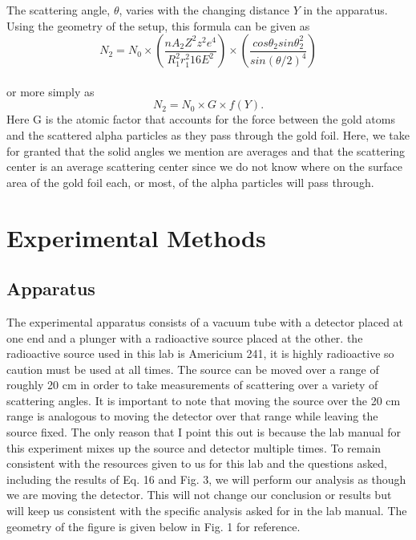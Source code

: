 The scattering angle, $\theta$, varies with the changing distance $Y$ in the apparatus. Using the geometry of the setup, this formula can be given as
\begin{equation} \label{complicated}N_2=N_0\times \left( \frac{nA_2Z^2z^2e^4}{R_1^2r_1^2 16 E^2}\right)\times \left(\frac{cos\theta_2 sin\theta_2^2}{sin(\theta/2)^4}\right) \end {equation}\\or more simply as\begin{equation}  \label{simple}N_2=N_0\times G\times f(Y). \end{equation} Here G is the atomic factor that accounts for the force between the gold atoms and the scattered alpha particles as they pass through the gold foil. Here, we take for granted that the solid angles we mention are averages and that the scattering center is an average scattering center since we do not know where on the surface area of the gold foil each, or most, of the alpha particles will pass through. 
\section{Experimental Methods}
\subsection{Apparatus}
\indent \indent The experimental apparatus consists of a vacuum tube with a detector placed at one end and a plunger with a radioactive source placed at the other. the radioactive source used in this lab is Americium 241, it is highly radioactive so caution must be used at all times. The source can be moved over a range of roughly 20 cm in order to take measurements of scattering over a variety of scattering angles. It is important to note that moving the source over the 20 cm range is analogous to moving the detector over that range while leaving the source fixed.  The only reason that I point this out is because the lab manual for this experiment mixes up the source and detector multiple times.  To remain consistent with the resources given to us for this lab and the questions asked, including the results of Eq. 16 and Fig. 3, we will perform our analysis as though we are moving the detector.  This will not change our conclusion or results but will keep us consistent with the specific analysis asked for in the lab manual. The geometry of the figure is given below in Fig. 1 for reference.
 
